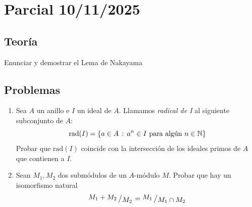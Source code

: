 \chapter{Parcial 10/11/2025}
\section*{Teor\'ia}
Enunciar y demostrar el Lema de Nakayama
\section*{Problemas}
\begin{enumerate}[1)]
    \item Sea $A$ un anillo e $I$ un ideal de $A$. Llamamos \textit{radical de I} al siguiente subconjunto de $A$:
    $$\text{rad}(I) = \{a\in A \, : \, a^n \in I \text{ para alg\'un } n \in \mathbb{N}\}$$
    Probar que $\text{rad}(I)$ coincide con la intersecci\'on de los ideales primos de $A$ que contienen a $I$.
    \item Sean $M_1,M_2$ dos subm\'odulos de un $A$-m\'odulo $M$. Probar que hay un isomorfismo natural 
    $$\modulo{M_1+M_2}{M_2} = \modulo{M_1}{M_1 \cap M_2}$$
\end{enumerate}
